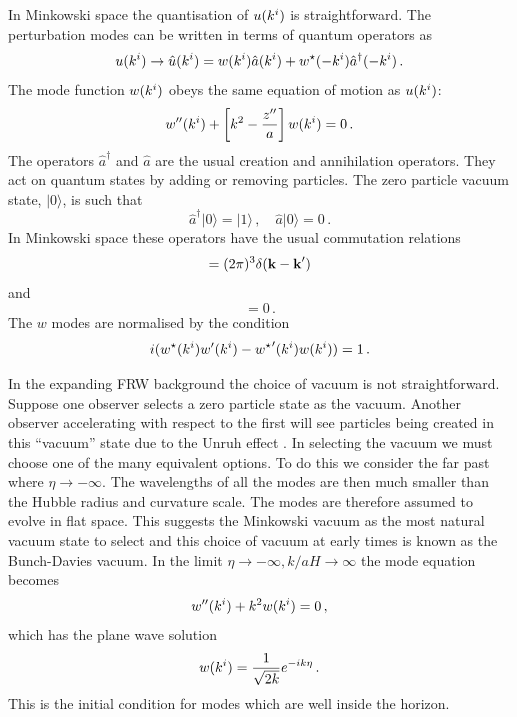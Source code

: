 In Minkowski space the quantisation of $u(k^i)$ is straightforward.
The perturbation modes can be written in terms of quantum operators as
% 
\begin{equation}
 u(k^i)\rightarrow\hat{u}(k^i) = 
  w(k^i) \hat{a}(k^i) + w^\star(-k^i)\hat{a}^\dagger(-k^i) \,.
\end{equation}
%
The mode function $w(k^i)$ obeys the same equation of motion as $u(k^i)$:
% 
\begin{equation}
\label{eq:weqn-intro}
 w''(k^i) + \left[ k^2 -\frac{z''}{a}\right]w(k^i) = 0\,.
\end{equation}
% 
The operators $\hat{a}^\dagger$ and $\hat{a}$ are the usual creation and
annihilation operators. They act on quantum states by adding or
removing particles. The zero particle vacuum state, $|0\rangle$, is such that
% 
\begin{equation}
 \hat{a}^\dagger|0\rangle = |1\rangle\,,\quad \hat{a}|0\rangle = 0\,.
\end{equation}
% 
In Minkowski space these operators have the usual commutation relations
% 
\begin{equation}
 [\hat{a}(\kb), \hat{a}^\dagger(\kb')] = (2\pi)^3 \delta(\kb -\kb') \\
\end{equation}
and
\begin{equation}
[\hat{a}(\kb), \hat{a}(\kb')] = 0\,.
\end{equation}
% 
The $w$ modes are normalised by the condition \cite{Mukhanov:2005sc}
% 
\begin{equation}
\label{eq:quantcondition-intro}
 i(w^\star(k^i)w'(k^i) - {w^{\star}}'(k^i)w(k^i)) = 1\,.
\end{equation}


In the expanding FRW background the choice of vacuum is not straightforward.
Suppose one observer selects a zero particle state as the vacuum. Another
observer accelerating with respect to the first will see particles being
created in this ``vacuum'' state due to the Unruh effect
\cite{Kinney2009, Unruh1976a}. In selecting the vacuum we must choose one of the
many equivalent options.
To do this we consider the far past where $\eta\rightarrow -\infty$. The wavelengths of all the
modes are then much smaller than the Hubble radius and curvature scale. The modes are
therefore assumed to evolve in flat space. This suggests the Minkowski vacuum as the
most natural vacuum state to select and this choice of vacuum at
early times is known as the Bunch-Davies vacuum.
% 
In the limit $\eta\rightarrow -\infty, k/aH\rightarrow \infty$ the mode equation
 becomes
% 
\begin{equation}
  w''(k^i) + k^2 w(k^i) = 0\,,
\end{equation}
% 
which has the plane wave solution
% 
\begin{equation}
\label{eq:subhsoln-intro}
 w(k^i) = \frac{1}{\sqrt{2k}} e^{-ik\eta}\,.
\end{equation}
% 
This is the initial condition for modes which are well inside the horizon.

